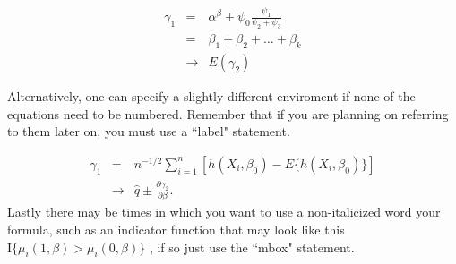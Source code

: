 \begin{eqnarray}
\gamma_1 & = & \alpha^{\beta} + \psi_0 \frac{\psi_1}{\psi_2+\psi_3} \label{eq.two} \\
& = & \beta_1 + \beta_2 + \ldots + \beta_k \nonumber\\
& \rightarrow & E(\gamma_2) 
\end{eqnarray}

Alternatively, one can specify a slightly different enviroment if none of the equations need to be numbered.  Remember that if you are planning on referring to them later on, you must use a ``label" statement.

\begin{eqnarray*}
\gamma_1 & = & n^{-1/2} \displaystyle \sum_{i=1}^n \left[h(X_i,\beta_0)-E\{h(X_i,\beta_0)\}\right]\\
& \rightarrow & \hat q \pm \frac{\partial \gamma_2}{\partial \beta}. 
\end{eqnarray*}  Lastly there may be times in which you want to use a non-italicized word your formula, such as an indicator function that may look like this $\mbox{I}\{\mu_i(1,\beta)>\mu_i(0,\beta)\}$ , if so just use the ``mbox" statement.

